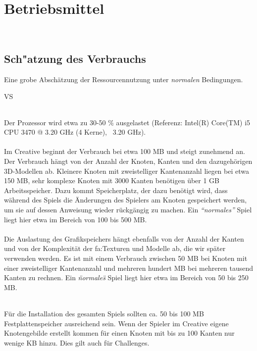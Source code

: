 %
%


\chapter{Betriebsmittel}
\label{BM}~\\

\section{Sch{"a}tzung des Verbrauchs}
\label{BM:Verbrauch}

Eine grobe Abschätzung der Ressourcennutzung unter \textit{normalen} Bedingungen.\\

\begin{ids}{\gls{VS}}

	 \hfill\\

	Der Prozessor wird etwa zu 30-50 \% ausgelastet (Referenz: Intel(R) Core(TM) i5 CPU 3470 @ 3.20 GHz (4 Kerne), ~3.20 GHz).\\
	
	 \hfill\\
	
	Im Creative beginnt der Verbrauch bei etwa 100 MB und steigt zunehmend an. Der Verbrauch hängt von der Anzahl der Knoten, Kanten und den dazugehörigen 3D-Modellen ab. Kleinere Knoten mit zweistelliger Kantenanzahl	liegen bei etwa 150 MB, sehr komplexe Knoten mit 3000 Kanten benötigen über 1 GB Arbeitsspeicher. Dazu kommt Speicherplatz, der dazu benötigt wird, dass während des Spiels die Änderungen des Spielers am Knoten gespeichert werden, um sie auf dessen Anweisung wieder rückgängig zu machen. Ein \textit{\textquotedblleft{}normales\textquotedblright} Spiel liegt hier etwa im Bereich von 100 bis 500 MB.\\

	 \hfill\\
	
	Die Auslastung des Grafikspeichers hängt ebenfalls von der Anzahl der Kanten und von der Komplexität der \gls{fa:Textur}en und Modelle ab, die wir später verwenden werden. Es ist mit einem Verbrauch zwischen 50 MB bei Knoten mit einer zweistelliger Kantenanzahl und mehreren hundert MB bei mehreren tausend Kanten zu rechnen.
	Ein \textit{\"normales\"} Spiel liegt hier etwa im Bereich von 50 bis 250 MB.


\clearpage


	 \hfill\\
		
	Für die Installation des gesamten Spiels sollten ca. 50 bis 100 MB Festplattenspeicher ausreichend sein. Wenn der Spieler im Creative eigene Knotengebilde erstellt kommen für einen Knoten mit bis zu 100 Kanten nur wenige KB hinzu. Dies gilt auch für Challenges.\\

\end{ids}


